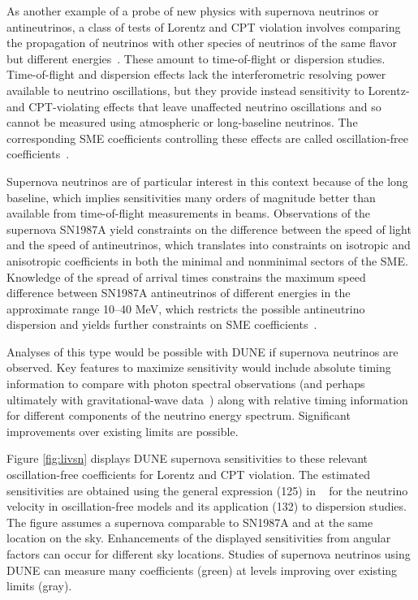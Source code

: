As another example of a probe of new physics with supernova neutrinos or antineutrinos,
a class of tests of Lorentz and CPT violation involves comparing the propagation of neutrinos with other species of neutrinos of the same flavor but different energies~\cite{Kostelecky:2003cr,Kostelecky:2003xn,Kostelecky:2011gq,Diaz:2009qk}. These amount to time-of-flight or dispersion studies.
Time-of-flight and dispersion effects lack the interferometric resolving power available to neutrino oscillations, but they provide instead sensitivity to Lorentz- and CPT-violating effects that  leave unaffected neutrino oscillations
and so cannot be measured using atmospheric or long-baseline neutrinos.
The corresponding SME coefficients controlling these effects are called oscillation-free coefficients~\cite{Kostelecky:2011gq}.

Supernova neutrinos are of particular interest in this context because of the long baseline, which implies sensitivities many orders of magnitude better than available from time-of-flight measurements in beams. Observations of the supernova SN1987A yield constraints on the difference between the speed of light and the speed of antineutrinos, which translates into constraints on isotropic and anisotropic coefficients in both the minimal and nonminimal sectors of the SME. Knowledge of the spread of arrival times constrains the maximum speed difference between SN1987A antineutrinos of different energies in the approximate range 10--40 MeV, which restricts the possible antineutrino dispersion and yields further constraints on SME coefficients~\cite{Kostelecky:2011gq}.

Analyses of this type would be possible with DUNE if supernova neutrinos are observed. Key features to maximize sensitivity would include absolute timing information to compare with photon spectral observations (and perhaps ultimately with gravitational-wave data~\cite{Kostelecky:2016kfm})  along with relative timing information for different components of the neutrino energy spectrum. Significant improvements over existing limits are possible.

Figure \ref{fig:livsn} displays DUNE supernova sensitivities 
to these relevant oscillation-free coefficients 
for Lorentz and CPT violation.
The estimated sensitivities are obtained using
the general expression (125) in ~\cite{Kostelecky:2011gq}
for the neutrino velocity in oscillation-free models
and its application (132) to dispersion studies.
The figure assumes a supernova comparable to SN1987A
and at the same location on the sky.
Enhancements of the displayed sensitivities 
from angular factors can occur for different sky locations.
Studies of supernova neutrinos using DUNE 
can measure many coefficients (green) 
at levels improving over existing limits (gray).

